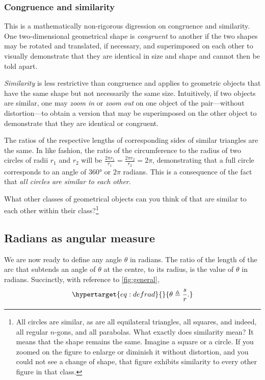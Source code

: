 \documentclass[
  a4paper,
]{article}
\begin{document}
\hypertarget{congruence-and-similarity}{%
\subsubsection{Congruence and
similarity}\label{congruence-and-similarity}}

This is a mathematically non-rigorous digression on congruence and
similarity. One two-dimensional geometrical shape is \emph{congruent} to
another if the two shapes may be rotated and translated, if necessary,
and superimposed on each other to visually demonstrate that they are
identical in size and shape and cannot then be told apart.

\emph{Similarity} is less restrictive than congruence and applies to
geometric objects that have the same shape but not necessarily the same
size. Intuitively, if two objects are similar, one may \emph{zoom in} or
\emph{zoom out} on one object of the pair---without distortion---to
obtain a version that may be superimposed on the other object to
demonstrate that they are identical or congruent.

The ratios of the respective lengths of corresponding sides of similar
triangles are the same. In like fashion, the ratio of the circumference
to the radius of two circles of radii \(r_1\) and \(r_2\) will be
\(\frac{2\pi r_1}{r_1} =\frac{2\pi r_2}{r_2} = 2\pi\), demonstrating
that a full circle corresponds to an angle of 360° or \(2\pi\) radians.
This is a consequence of the fact that \emph{all circles are similar to
each other}.

What other classes of geometrical objects can you think of that are
similar to each other within their class?\footnote{All circles are
  similar, as are all equilateral triangles, all squares, and indeed,
  all regular \(n\)-gons, and all parabolas. What exactly does
  similarity mean? It means that the shape remains the same. Imagine a
  square or a circle. If you zoomed on the figure to enlarge or diminish
  it without distortion, and you could not see a change of shape, that
  figure exhibits similarity to every other figure in that class.}

\hypertarget{radians-as-angular-measure}{%
\subsection{Radians as angular
measure}\label{radians-as-angular-measure}}

We are now ready to define any angle \(\theta\) in radians. The ratio of
the length of the arc that subtends an angle of \(\theta\) at the
centre, to its radius, is the value of \(\theta\) in radians.
Succinctly, with reference to \cref{fig:general},
\begin{equation}\protect\hypertarget{eq:defrad}{}{
\theta \triangleq\frac{s}{r}.
}\label{eq:defrad}\end{equation}
\end{document}
